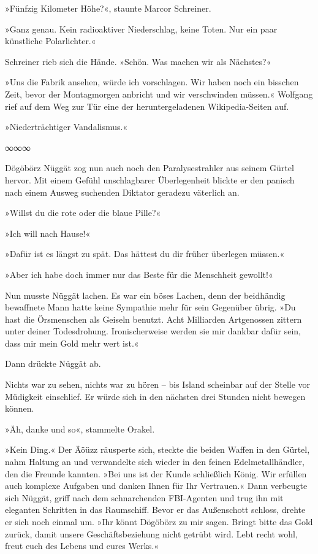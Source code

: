 »Fünfzig Kilometer Höhe?«, staunte Marcor Schreiner.

»Ganz genau. Kein radioaktiver Niederschlag, keine Toten. Nur ein paar künstliche Polarlichter.«

Schreiner rieb sich die Hände. »Schön. Was machen wir als Nächstes?«

»Uns die Fabrik ansehen, würde ich vorschlagen. Wir haben noch ein bisschen Zeit, bevor der Montagmorgen anbricht und wir verschwinden müssen.« Wolfgang rief auf dem Weg zur Tür eine der heruntergeladenen Wikipedia-Seiten auf.


»Niederträchtiger Vandalismus.«

\begin{center}
∞∞∞
\end{center}

Dögöbörz Nüggät zog nun auch noch den Paralysestrahler aus seinem Gürtel hervor. Mit einem Gefühl unschlagbarer Überlegenheit blickte er den panisch nach einem Ausweg suchenden Diktator geradezu väterlich an.

»Willst du die rote oder die blaue Pille?«

»Ich will nach Hause!«

»Dafür ist es längst zu spät. Das hättest du dir früher überlegen müssen.«

»Aber ich habe doch immer nur das Beste für die Menschheit gewollt!«

Nun musste Nüggät lachen. Es war ein böses Lachen, denn der beidhändig bewaffnete Mann hatte keine Sympathie mehr für sein Gegenüber übrig. »Du hast die Örsmenschen als Geiseln benutzt. Acht Milliarden Artgenossen zittern unter deiner Todesdrohung. Ironischerweise werden sie mir dankbar dafür sein, dass mir mein Gold mehr wert ist.«

Dann drückte Nüggät ab.

Nichts war zu sehen, nichts war zu hören – bis Island scheinbar auf der Stelle vor Müdigkeit einschlief. Er würde sich in den nächsten drei Stunden nicht bewegen können.

»Äh, danke und so«, stammelte Orakel.

»Kein Ding.« Der Äöüzz räusperte sich, steckte die beiden Waffen in den Gürtel, nahm Haltung an und verwandelte sich wieder in den feinen Edelmetallhändler, den die Freunde kannten. »Bei uns ist der Kunde schließlich König. Wir erfüllen auch komplexe Aufgaben und danken Ihnen für Ihr Vertrauen.« Dann verbeugte sich Nüggät, griff nach dem schnarchenden FBI-Agenten und trug ihn mit eleganten Schritten in das Raumschiff. Bevor er das Außenschott schloss, drehte er sich noch einmal um. »Ihr könnt Dögöbörz zu mir sagen. Bringt bitte das Gold zurück, damit unsere Geschäftsbeziehung nicht getrübt wird. Lebt recht wohl, freut euch des Lebens und eures Werks.«


